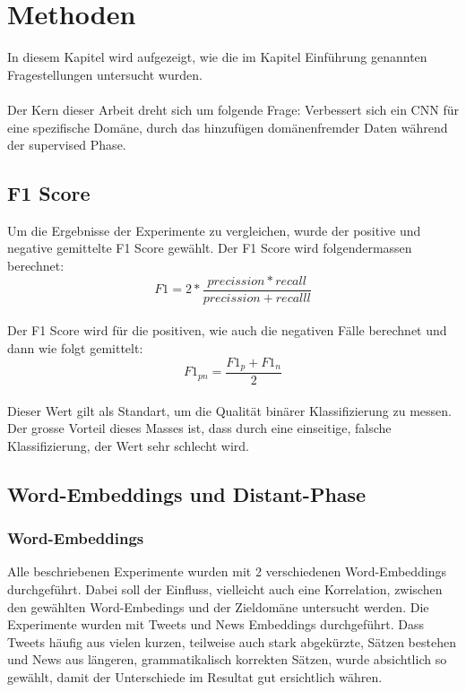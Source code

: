 \chapter{Methoden}
\label{methods}
In diesem Kapitel wird aufgezeigt, wie die im Kapitel Einführung genannten Fragestellungen untersucht wurden.\\\\
Der Kern dieser Arbeit dreht sich um folgende Frage: Verbessert sich ein CNN für eine spezifische Domäne, durch das hinzufügen domänenfremder Daten während der supervised Phase.
\section{F1 Score}
Um die Ergebnisse der Experimente zu vergleichen, wurde der positive und negative gemittelte F1 Score gewählt.
Der F1 Score wird folgendermassen berechnet:\\
\begin{equation}
F1 = 2*\frac{precission*recall}{precission+recalll}
\end{equation}\\
Der F1 Score wird für die positiven, wie auch die negativen Fälle berechnet und dann wie folgt gemittelt:\\
\begin{equation}
F1_{pn} = \frac{F1_p+F1_n}{2}
\end{equation}\\
Dieser Wert gilt als Standart, um die Qualität binärer Klassifizierung zu messen. Der grosse Vorteil dieses Masses ist, dass durch eine einseitige, falsche Klassifizierung, der Wert sehr schlecht wird.
\section{Word-Embeddings und Distant-Phase}
\subsection{Word-Embeddings}
Alle beschriebenen Experimente wurden mit 2 verschiedenen Word-Embeddings durchgeführt. Dabei soll der Einfluss, vielleicht auch eine Korrelation, zwischen den gewählten Word-Embedings und der Zieldomäne untersucht werden. Die Experimente wurden mit Tweets und News Embeddings durchgeführt. Dass Tweets häufig aus vielen kurzen, teilweise auch stark abgekürzte, Sätzen bestehen und News aus längeren, grammatikalisch korrekten Sätzen, wurde absichtlich so gewählt, damit der Unterschiede im Resultat gut ersichtlich währen.
